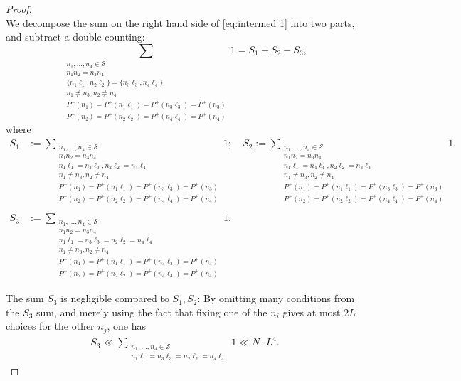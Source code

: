 \documentclass[10pt,a4paper]{amsart}
\newcommand{\CS}{\mathcal{S}}
\renewcommand{\P}{\mathbb{P}}
\renewcommand{\l}{\ell}
\begin{document}
\begin{proof}
\begin{equation}
		\end{equation}
		We decompose the sum on the right hand side of \eqref{eq:intermed 1} into two parts, and subtract a double-counting:
		\begin{equation}\label{eq: S1 S2 decomp}
			\sum_{\substack{n_1,\dots,n_4 \in \CS \\ n_1n_2=n_3n_4 \\ \{n_1\l_1,n_2\l_2\}=\{n_3\l_3,n_4\l_4\} \\ n_1 \ne n_3,n_2 \ne n_4 \\ P^+(n_1)=P^+(n_1 \l_1)=P^+(n_3 \l_3) = P^+(n_3) \\ P^+(n_2) = P^+(n_2 \l_2) = P^+(n_4 \l_4) = P^+(n_4) }} 1 = S_1 + S_2 - S_3,
		\end{equation}
		where
		\begin{align*}
			S_1 &:= \sum_{\substack{n_1,\dots,n_4 \in \CS \\ n_1n_2=n_3n_4 \\ n_1\l_1=n_3\l_3, n_2\l_2 = n_4\l_4 \\ n_1 \ne n_3,n_2 \ne n_4 \\ P^+(n_1) = P^+(n_1 \l_1)=P^+(n_3 \l_3) = P^+(n_3) \\P^+(n_2) =  P^+(n_2 \l_2) = P^+(n_4 \l_4) = P^+(n_4)}} 1; \quad S_2 := \sum_{\substack{n_1,\dots,n_4 \in \CS \\ n_1n_2=n_3n_4 \\ n_1\l_1=n_4\l_4, n_2\l_2 = n_3\l_3 \\ n_1 \ne n_3,n_2 \ne n_4 \\ P^+(n_1) = P^+(n_1 \l_1)=P^+(n_3 \l_3) = P^+(n_3) \\P^+(n_2) =  P^+(n_2 \l_2) = P^+(n_4 \l_4) = P^+(n_4)}} 1. \\ \\
			S_3 &:= \sum_{\substack{n_1,\dots,n_4 \in \CS \\ n_1n_2=n_3n_4 \\ n_1\l_1=n_3\l_3= n_2\l_2 = n_4\l_4 \\ n_1 \ne n_3,n_2 \ne n_4 \\ P^+(n_1) = P^+(n_1 \l_1)=P^+(n_3 \l_3) = P^+(n_3) \\P^+(n_2) =  P^+(n_2 \l_2) = P^+(n_4 \l_4) = P^+(n_4)}} 1.
		\end{align*}
		
		The sum $S_3$ is negligible compared to $S_1,S_2$: By omitting many conditions from the $S_3$ sum, and merely using the fact that fixing one of the $n_i$ gives at most $2L$ choices for the other $n_j$, one has
		\begin{align}\label{eq:new S3 bound}
			S_3 \ll \sum_{\substack{n_1,\dots,n_4 \in \CS \\ n_1\l_1=n_3\l_3= n_2\l_2 = n_4\l_4}} 1 \ll N \cdot L^4.
		\end{align}
		

\end{proof}
\end{document}
